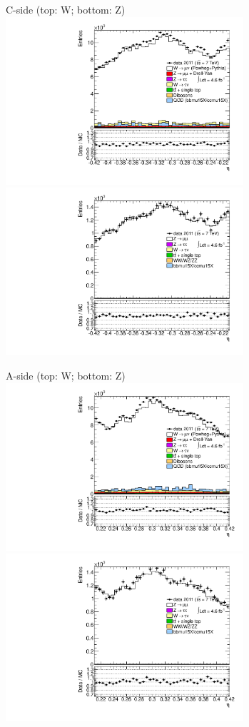 {

\colb[T]

C-side (top: W; bottom: Z)
\centering
\includegraphics[width=0.66\textwidth]{dates/20130306/figures/etaphi/W_2_C_stack_l_eta_POS} \\
\includegraphics[width=0.66\textwidth]{dates/20130306/figures/etaphi/Z_2_C_stack_lP_eta_ALL.pdf}

A-side (top: W; bottom: Z)
\centering
\includegraphics[width=0.66\textwidth]{dates/20130306/figures/etaphi/W_2_A_stack_l_eta_POS} \\
\includegraphics[width=0.66\textwidth]{dates/20130306/figures/etaphi/Z_2_A_stack_lP_eta_ALL.pdf} 

\cole
}


